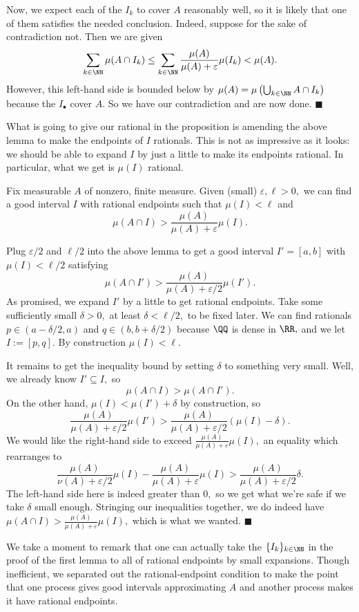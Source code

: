 Now, we expect each of the $I_k$ to cover $A$ reasonably well, so it is likely that one of them satisfies the needed conclusion. Indeed, suppose for the sake of contradiction not. Then we are given
\[\sum_{k\in\NN}\mu(A\cap I_k)\le\sum_{k\in\NN}\frac{\mu(A)}{\mu(A)+\varepsilon}\mu(I_k)<\mu(A).\]
However, this left-hand side is bounded below by $\mu(A)=\mu\left(\bigcup_{k\in\NN}A\cap I_k\right)$ because the $I_\bullet$ cover $A.$ So we have our contradiction and are now done. $\blacksquare$

What is going to give our rational in the proposition is amending the above lemma to make the endpoints of $I$ rationals. This is not as impressive as it looks: we should be able to expand $I$ by just a little to make its endpoints rational. In particular, what we get is $\mu(I)$ rational.
\begin{lemma}
    Fix measurable $A$ of nonzero, finite measure. Given (small) $\varepsilon,\ell>0,$ we can find a good interval $I$ with rational endpoints such that $\mu(I)<\ell$ and
    \[\mu(A\cap I)>\frac{\mu(A)}{\mu(A)+\varepsilon}\mu(I).\]
\end{lemma}
Plug $\varepsilon/2$ and $\ell/2$ into the above lemma to get a good interval $I'=[a,b]$ with $\mu(I)<\ell/2$ satisfying
\[\mu(A\cap I')>\frac{\mu(A)}{\mu(A)+\varepsilon/2}\mu(I').\]
As promised, we expand $I'$ by a little to get rational endpoints. Take some sufficiently small $\delta>0,$ at least $\delta<\ell/2,$ to be fixed later. We can find rationals $p\in(a-\delta/2,a)$ and $q\in(b,b+\delta/2)$ because $\QQ$ is dense in $\RR,$ and we let $I:=[p,q].$ By construction $\mu(I)<\ell.$

It remains to get the inequality bound by setting $\delta$ to something very small. Well, we already know $I'\subseteq I,$ so
\[\mu(A\cap I)>\mu(A\cap I').\]
On the other hand, $\mu(I)<\mu(I')+\delta$ by construction, so
\[\frac{\mu(A)}{\mu(A)+\varepsilon/2}\mu(I')>\frac{\mu(A)}{\mu(A)+\varepsilon/2}(\mu(I)-\delta).\]
We would like the right-hand side to exceed $\frac{\mu(A)}{\mu(A)+\varepsilon}\mu(I),$ an equality which rearranges to
\[\frac{\mu(A)}{\nu(A)+\varepsilon/2}\mu(I)-\frac{\mu(A)}{\mu(A)+\varepsilon}\mu(I)>\frac{\mu(A)}{\mu(A)+\varepsilon/2}\delta.\]
The left-hand side here is indeed greater than $0,$ so we get what we're safe if we take $\delta$ small enough. Stringing our inequalities together, we do indeed have $\mu(A\cap I)>\frac{\mu(A)}{\mu(A)+\varepsilon}\mu(I),$ which is what we wanted. $\blacksquare$

We take a moment to remark that one can actually take the $\{I_k\}_{k\in\NN}$ in the proof of the first lemma to all of rational endpoints by small expansions. Though inefficient, we separated out the rational-endpoint condition to make the point that one process gives good intervals approximating $A$ and another process makes it have rational endpoints.

